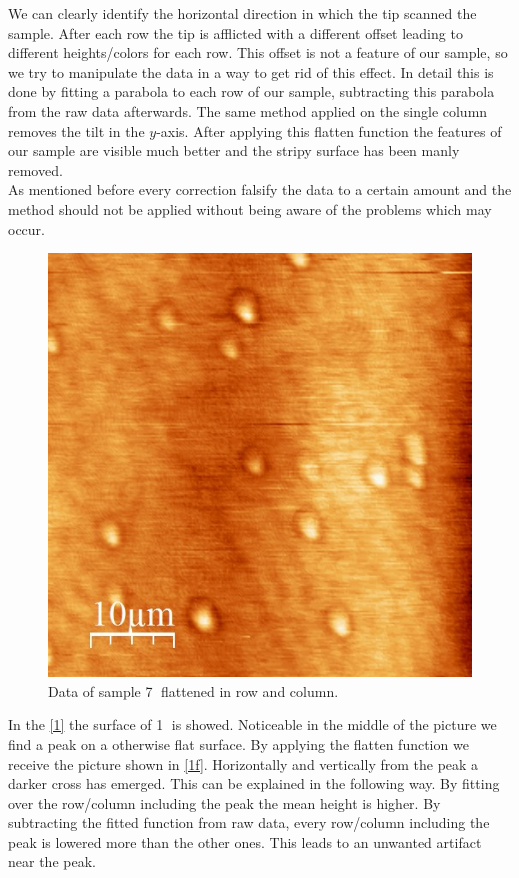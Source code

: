 \documentclass[paper=a4,fontsize=10pt,DIV=18,twocolumn,parskip=half]{scrartcl}
\numberwithin{equation}{section}    %
\begin{document}
We can clearly identify the horizontal direction in which the tip scanned the 
sample. After each row the tip is afflicted with a different offset leading to 
different heights/colors for each row. This offset is not a feature of our 
sample, so we try to manipulate the data in a way to get rid of this effect.
In detail this is done by fitting a parabola to each row of our sample, 
subtracting this parabola from the raw data afterwards. The same method applied 
on the single column removes the tilt in the $y$-axis. After applying this 
flatten function the features of our sample are visible much better and the 
stripy surface has been manly removed. \\
As mentioned before every correction falsify the data to a certain amount and 
the method should not be applied without being aware of the problems which may 
occur.

\begin{figure}[htp]
    \begin{center}
        \includegraphics[width=0.7\columnwidth]{Bilder/7f}
        \caption{Data of sample \textcircled{7} flattened in row and column. }
        \label{7f}
    \end{center}
\end{figure}

In the \ref{1} the surface of \textcircled{1} is showed. Noticeable in the 
middle of the picture we find a peak on a otherwise flat surface. By applying 
the flatten function we receive the picture shown in \ref{1f}. Horizontally and 
vertically from the peak a darker cross has emerged. This can be explained in 
the following way. By fitting over the row/column including the peak the mean 
height is higher. By subtracting the fitted function from raw data, every 
row/column including the peak is lowered more than the other ones. This leads to 
an unwanted artifact near the peak.
\end{document}

